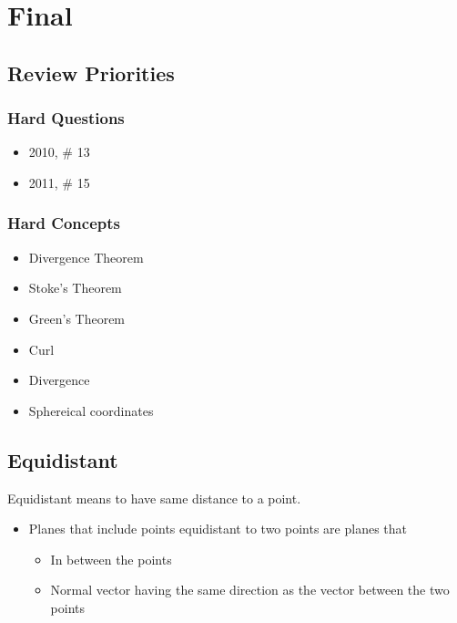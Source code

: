 \section{Final}

  \subsection{Review Priorities}

    \subsubsection{Hard Questions}

      \begin{itemize}
        \item 2010, \# 13
        \item 2011, \# 15
      \end{itemize}

    \subsubsection{Hard Concepts}

      \begin{itemize}
        \item Divergence Theorem
        \item Stoke's Theorem
        \item Green's Theorem
        \item Curl
        \item Divergence
        \item Sphereical coordinates
      \end{itemize}

  \subsection{Equidistant}

    Equidistant means to have same distance to a point.

    \begin{itemize}
      \item Planes that include points equidistant to two points are planes
      that
      \begin{itemize}
        \item In between the points
        \item Normal vector having the same direction as the vector between the
        two points
      \end{itemize}
    \end{itemize}

